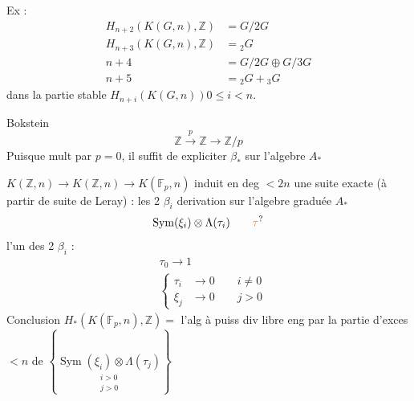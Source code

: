 Ex :
\[
\left.\begin{aligned}
H_{n+2}(K(G,n),\mathbb Z)&=G/2G\\
H_{n+3}(K(G,n),\mathbb Z)&={}_2G\\
n+4\qquad &=G/2G\oplus G/3G\\
n+5\qquad &={}_2G+{}_3G
\end{aligned}\right.
\]
dans la partie stable $H_{n+i}(K(G,n))$\quad $0\leq i<n$.

Bokstein
\[
\mathbb Z\xrightarrow{p}\mathbb Z\longrightarrow\mathbb Z/p
\]
Puisque mult par $p=0$, il suffit de  expliciter $\beta_*$ sur l'algebre $A_*$

 $K(\mathbb Z,n)\longrightarrow K(\mathbb Z,n)\longrightarrow K(\mathbb F_p,n)$ induit en deg $<2n$ une suite exacte (à partir de suite de Leray) :
les 2 $\beta_i$   derivation sur l'algebre graduée $A_*$
\[
\operatorname{Sym}(\xi_i)\otimes\Lambda(\tau_i)\qquad\unsure{\tau}
\]
l'un des 2 $\beta_i$ :
\[
\begin{aligned}
&\tau_0\longrightarrow1\\
&\left\{\begin{aligned}\tau_i&\longrightarrow0\qquad i\ne0\\
\xi_j&\longrightarrow0\qquad j>0\end{aligned}\right.
\end{aligned}
\]
Conclusion \quad $H_*(K(\mathbb F_p,n),\mathbb Z)={}$  l'alg à puiss div libre eng par la partie d'exces $<n$ de
$\left\{\underset{\substack{i>0\\j>0}}{\operatorname{Sym}(\xi_i)\otimes\Lambda(\tau_j)}\right\}$

